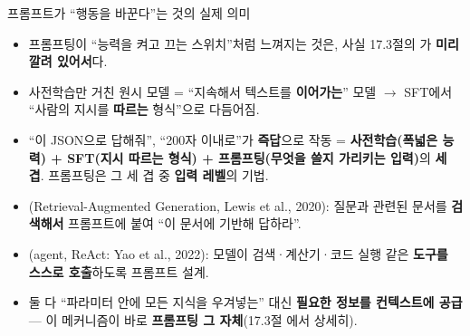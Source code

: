 \documentclass[aspectratio=169,11pt]{beamer}
\begin{document}
\begin{frame}{프롬프트가 ``행동을 바꾼다''는 것의 실제 의미}
  \begin{itemize}
    \item 프롬프팅이 ``능력을 켜고 끄는 스위치''처럼
      느껴지는 것은, 사실 17.3절의 가
      \textbf{미리 깔려 있어서}다.
    \item 사전학습만 거친 원시 모델 = ``지속해서 텍스트를
      \textbf{이어가는}'' 모델 $\to$ SFT에서 ``사람의
      지시를 \textbf{따르는} 형식''으로 다듬어짐.
    \item ``이 JSON으로 답해줘'', ``200자 이내로''가
      \textbf{즉답}으로 작동 =
      \textbf{사전학습(폭넓은 능력) + SFT(지시 따르는
      형식) + 프롬프팅(무엇을 쓸지 가리키는 입력)}의
      \textbf{세 겹}. 프롬프팅은 그 세 겹 중
      \textbf{입력 레벨}의 기법.
    \item {}(Retrieval-Augmented Generation, Lewis
      et al., 2020): 질문과 관련된 문서를 \textbf{검색해서}
      프롬프트에 붙여 ``이 문서에 기반해 답하라''.
    \item {}(agent, ReAct: Yao et al., 2022):
      모델이 검색·계산기·코드 실행 같은 \textbf{도구를
      스스로 호출}하도록 프롬프트 설계.
    \item 둘 다 ``파라미터 안에 모든 지식을 우겨넣는''
      대신 \textbf{필요한 정보를 컨텍스트에 공급} ---
      이 메커니즘이 바로 \textbf{프롬프팅 그 자체}(17.3절
     에서 상세히).
  \end{itemize}
\end{frame}

\end{document}
